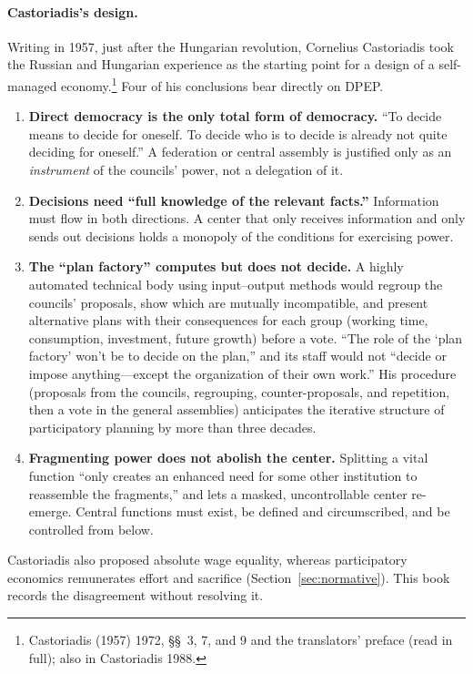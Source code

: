 \documentclass[10pt,twoside,openany]{book}
\theoremstyle{dpepstyle}
\begin{document}
\paragraph{Castoriadis's design.} Writing in 1957, just after the Hungarian revolution, Cornelius Castoriadis took the Russian and Hungarian experience as the starting point for a design of a self-managed economy.\footnote{Castoriadis (1957) 1972, \S\S~3, 7, and 9 and the translators' preface (read in full); also in Castoriadis 1988.} Four of his conclusions bear directly on DPEP.
\begin{enumerate}[leftmargin=1.8em,itemsep=2pt]
  \item \textbf{Direct democracy is the only total form of democracy.} ``To decide means to decide for oneself. To decide who is to decide is already not quite deciding for oneself.'' A federation or central assembly is justified only as an \emph{instrument} of the councils' power, not a delegation of it.
  \item \textbf{Decisions need ``full knowledge of the relevant facts.''} Information must flow in both directions. A center that only receives information and only sends out decisions holds a monopoly of the conditions for exercising power.
  \item \textbf{The ``plan factory'' computes but does not decide.} A highly automated technical body using input--output methods would regroup the councils' proposals, show which are mutually incompatible, and present alternative plans with their consequences for each group (working time, consumption, investment, future growth) before a vote. ``The role of the `plan factory' won't be to decide on the plan,'' and its staff would not ``decide or impose anything---except the organization of their own work.'' His procedure (proposals from the councils, regrouping, counter-proposals, and repetition, then a vote in the general assemblies) anticipates the iterative structure of participatory planning by more than three decades.
  \item \textbf{Fragmenting power does not abolish the center.} Splitting a vital function ``only creates an enhanced need for some other institution to reassemble the fragments,'' and lets a masked, uncontrollable center re-emerge. Central functions must exist, be defined and circumscribed, and be controlled from below.
\end{enumerate}
Castoriadis also proposed absolute wage equality, whereas participatory economics remunerates effort and sacrifice (Section~\ref{sec:normative}). This book records the disagreement without resolving it.
\end{document}
